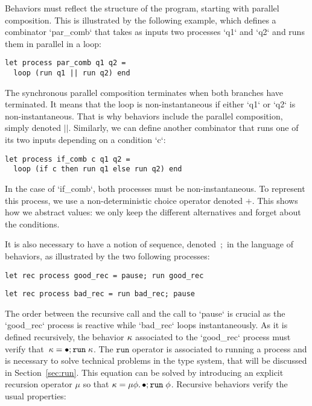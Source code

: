 \documentclass[9pt,preprint]{sigplanconf}
\begin{document}
Behaviors must reflect the structure of the program, starting with parallel composition. This is illustrated by the following example, which defines a combinator `par_comb` that takes as inputs two processes `q1` and `q2` and runs them in parallel in a loop: 
\begin{lstlisting}
let process par_comb q1 q2 =
  loop (run q1 || run q2) end
\end{lstlisting}
The synchronous parallel composition terminates when both bran\-ches have terminated. It means that the loop is non-instantaneous if either `q1` or `q2` is non-instantaneous.  That is why behaviors include the parallel composition, simply denoted $||$.
%
Similarly, we can define another combinator that runs one of its two inputs depending on a condition `c`:
\begin{lstlisting}
let process if_comb c q1 q2 =
  loop (if c then run q1 else run q2) end
\end{lstlisting}
In the case of `if_comb`, both processes must be non-instantaneous. To represent this process, we use a non-deterministic choice operator denoted $+$. This shows how  we abstract values: we only keep the different alternatives and forget about the conditions.

It is also necessary to have a notion of sequence, denoted~$;$ in the language of behaviors, as illustrated by the two following processes: 
\begin{lstlisting}
let rec process good_rec = pause; run good_rec
\end{lstlisting}
\vspace{-0.5em}
\begin{lstlisting}
let rec process bad_rec = run bad_rec; pause
\end{lstlisting}
The order between the recursive call and the call to `pause` is crucial as the `good_rec` process is reactive while `bad_rec` loops instantaneously.
%
As it is defined recursively, the behavior  $\kappa$  associated to the `good_rec` process must verify that~\mbox{$ \kappa = \bullet ; \mathtt{run}\; \kappa$}. The $\mathtt{run}$ operator is associated to running a process and is necessary to solve technical problems in the type system, that will be discussed in Section~\ref{sec:run}. This equation can be solved by introducing an explicit recursion operator $\mu$ so that $\kappa = \mu \phi.\, \bullet ; \mathtt{run}\; \phi$. Recursive behaviors verify the usual properties:
\end{document}

